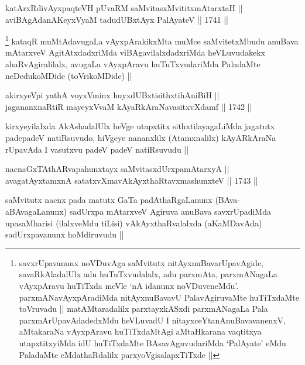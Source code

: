 \begin{shl}
katArxRdivAyxpaqteVH pUvaRM saMvitasxMvititxmAtarxtaH || \\
aviBAgAdanAKeyxVyaM tadudUBxtAyx PalAyateV ||  1741 ||  
\end{shl}

\begin{artha}
\footnote[3]{savxrUpavanunx noVDuvAga saMvitutx
  nitAyxnuBavarUpavAgide, savaRkAladalUlx adu huTuTxvudalalx, adu
  parxmAta, parxmANagaLa vAyxpAravu huTiTxda meVle `nA idanunx
  noVDuveneMdu'. parxmANavAyxpAradiMda nitAyxnuBavavU PalavAgiruvaMte
  huTiTxdaMte toVruvadu || matAMtaradalilx parxtayxkASxdi parxmANagaLa
  Pala parxmArUpavAdadedxMdu heVLuvadU I nitayxceYtanAnuBavavanenxV,
  aMtakaraNa vAyxpAravu huTiTxdaMtAgi aMtaHkarana vaqtitxya
  utapxtitxyiMda idU huTiTxdaMte BAsavAguvudariMda `PalAyate' eMdu
  PaladaMte eMdathaRdalilx parxyoVgisalapxTiTxde ||}
kataqR muMtAdavugaLa vAyxpArakikxMta muMce
saMvitetxMbudu anuBava mAtarxveV AgitAtxdadxriMda
viBAgavilalxdadxriMda heVLuvudakekx
ahaRvAgiralilalx, \footnotemark[2]avugaLa vAyxpAravu huTuTxvudariMda
PaladaMte neDedukoMDide (toVrikoMDide) ||
\end{artha}


\begin{shl}
akirxyeV\s pi yathA voyxVminx huyxdUBxtisithxtihAniBiH || \\
jagananxnaRtiR mayeyxVvaM kAyaRkAraNavasitxvXdamf ||  1742 ||  
\end{shl}

\begin{artha}
kirxyeyilalxda AkAshadalUlx heVge utapxtitx sithxtilayagaLiMda
jagatutx padepadeV natiRsuvudo, hiVgeye nananxlilx (Atamxnalilx)
kAyARkAraNa rUpavAda I vasutxvu padeV padeV natiRsuvudu ||
\end{artha}


\begin{shl}
nacnaGxTAthARvapahunxtayx saMvitasxdUrxpamAtarxyA ||  \\
avagatAyxtamxnA satatxvXmavAkAyxthaRtavxmashunxteV ||  1743 || 
\end{shl}

\begin{artha}
saMvitutx nacnx pada matutx GaTa padAthaRgaLanunx (BAva-aBAvagaLanunx)
sadUrxpa mAtarxveV Agiruva anuBava savxrUpadiMda upasaMharisi
(ilalxveMdu tiLisi) vAkAyxthaRvalalxda (aKaMDavAda) sadUrxpavanunx
hoMdiruvudu ||
\end{artha}

